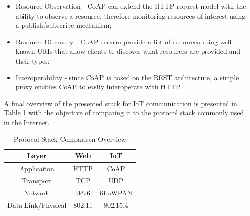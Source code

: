 \documentclass{llncs}
\begin{document}
\begin{itemize}
	\item Resource Observation - \ac{CoAP} can extend the \ac{HTTP} request model with the ability to observe a resource, therefore monitoring resources of interest using a publish/subscribe mechanism;
	\item Resource Discovery - \ac{CoAP} servers provide a list of resources using well-known {URIs} that allow clients to discover what resources are provided and their types;
	\item Interoperability - since \ac{CoAP} is based on the \ac{REST} architecture, a simple proxy enables \ac{CoAP} to easily interoperate with \ac{HTTP}.
\end{itemize}

A final overview of the presented stack for \ac{IoT} communication is presented in Table \ref{tab:stack} with the objective of comparing it to the protocol stack commonly used in the Internet.

\begin{table}[h]
	\centering
	\begin{center} \caption{Protocol Stack Comparison Overview } \label{tab:stack}\end{center}
	\begin{tabular}{c|c|c}
		Layer & Web & IoT \\
		\hline
		Application & \ac{HTTP} & \ac{CoAP} \\
		Transport & \ac{TCP} & \ac{UDP} \\
		Network & IPv6 & 6LoWPAN \\
		Data-Link/Physical & 802.11 & 802.15.4
	\end{tabular}
\end{table}
\end{document}

